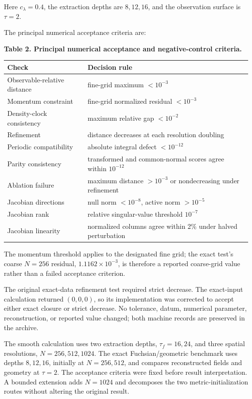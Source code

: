 \documentclass{iopjournal}
\begin{document}
Here $c_\lambda=0.4$, the extraction depths are $8,12,16$, and the observation surface is $\tau=2$.

The principal numerical acceptance criteria are:

\textbf{Table 2. Principal numerical acceptance and negative-control criteria.}

\begin{table}[H]
\centering
\small
\begin{tabularx}{\textwidth}{@{}lY@{}}
\toprule
\textbf{Check} & \textbf{Decision rule} \\
\midrule
Observable-relative distance & fine-grid maximum $<10^{-3}$ \\
Momentum constraint & fine-grid normalized residual $<10^{-3}$ \\
Density-clock consistency & maximum relative gap $<10^{-2}$ \\
Refinement & distance decreases at each resolution doubling \\
Periodic compatibility & absolute integral defect $<10^{-12}$ \\
Parity consistency & transformed and common-normal scores agree within $10^{-12}$ \\
Ablation failure & maximum distance $>10^{-3}$ or nondecreasing under refinement \\
Jacobian directions & null norm $<10^{-8}$, active norm $>10^{-5}$ \\
Jacobian rank & relative singular-value threshold $10^{-7}$ \\
Jacobian linearity & normalized columns agree within 2\% under halved perturbation \\
\bottomrule
\end{tabularx}
\end{table}
The momentum threshold applies to the designated fine grid; the exact test's coarse $N=256$ residual, $1.1162\times10^{-3}$, is therefore a reported coarse-grid value rather than a failed acceptance criterion.

The original exact-data refinement test required strict decrease. The exact-input calculation returned $(0,0,0)$, so its implementation was corrected to accept either exact closure or strict decrease. No tolerance, datum, numerical parameter, reconstruction, or reported value changed; both machine records are preserved in the archive.

The smooth calculation uses two extraction depths, $\tau_f=16,24$, and three spatial resolutions, $N=256,512,1024$. The exact Fuchsian/geometric benchmark uses depths $8,12,16$, initially at $N=256,512$, and compares reconstructed fields and geometry at $\tau=2$. The acceptance criteria were fixed before result interpretation. A bounded extension adds $N=1024$ and decomposes the two metric-initialization routes without altering the original result.
\end{document}
